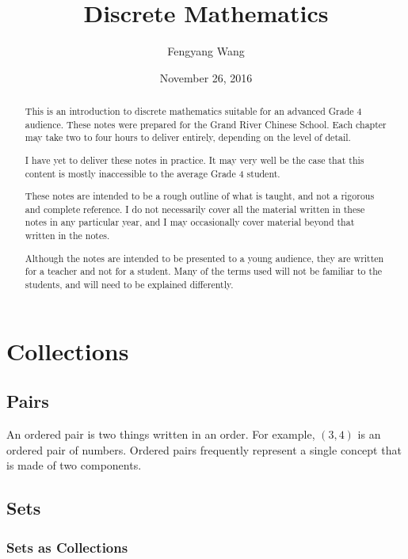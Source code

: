 \documentclass[a4paper,10pt]{report}
\title{Discrete Mathematics}
\author{Fengyang Wang}
\date{November 26, 2016}
\begin{document}
\begin{abstract}

This is an introduction to discrete mathematics suitable for an advanced Grade
4 audience. These notes were prepared for the Grand River Chinese School. Each
chapter may take two to four hours to deliver entirely, depending on the level
of detail.

I have yet to deliver these notes in practice. It may very well be the case
that this content is mostly inaccessible to the average Grade 4 student.

These notes are intended to be a rough outline of what is taught, and not a
rigorous and complete reference. I do not necessarily cover all the material
written in these notes in any particular year, and I may occasionally cover
material beyond that written in the notes.

Although the notes are intended to be presented to a young audience, they are
written for a teacher and not for a student. Many of the terms used will not be
familiar to the students, and will need to be explained differently.

\end{abstract}

\maketitle

\tableofcontents

\chapter{Collections}

\section{Pairs}

An \gls{ordered pair} is two things written in an order. For example, \((3,
4)\) is an ordered pair of numbers. Ordered pairs frequently represent a single
concept that is made of two components.

\section{Sets}

\subsection{Sets as Collections}
\end{document}
